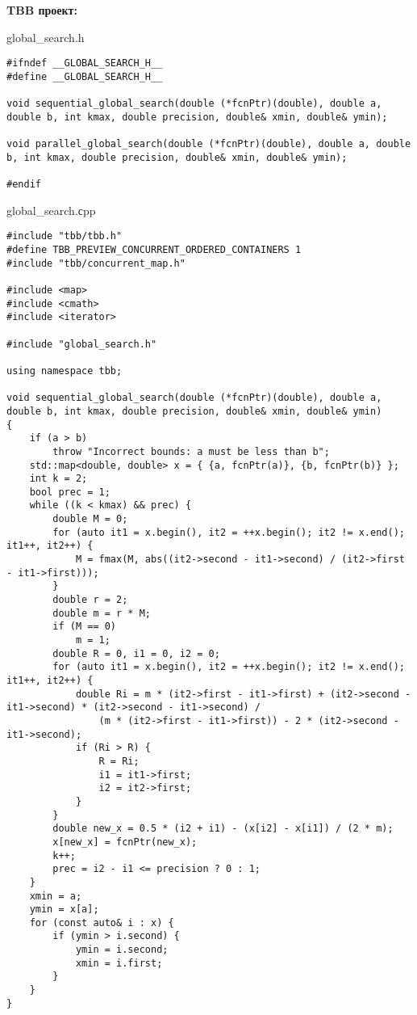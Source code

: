 \documentclass{report}
\begin{document}
\textbf{TBB проект:}

global\_search.h
\begin{lstlisting}
#ifndef __GLOBAL_SEARCH_H__
#define __GLOBAL_SEARCH_H__

void sequential_global_search(double (*fcnPtr)(double), double a, double b, int kmax, double precision, double& xmin, double& ymin);

void parallel_global_search(double (*fcnPtr)(double), double a, double b, int kmax, double precision, double& xmin, double& ymin);

#endif
\end{lstlisting}

global\_search.сpp
\begin{lstlisting}
#include "tbb/tbb.h"
#define TBB_PREVIEW_CONCURRENT_ORDERED_CONTAINERS 1
#include "tbb/concurrent_map.h"

#include <map>
#include <cmath>
#include <iterator>

#include "global_search.h"

using namespace tbb;

void sequential_global_search(double (*fcnPtr)(double), double a, double b, int kmax, double precision, double& xmin, double& ymin)
{
    if (a > b)
        throw "Incorrect bounds: a must be less than b";
    std::map<double, double> x = { {a, fcnPtr(a)}, {b, fcnPtr(b)} };
    int k = 2;
    bool prec = 1;
    while ((k < kmax) && prec) {
        double M = 0;
        for (auto it1 = x.begin(), it2 = ++x.begin(); it2 != x.end(); it1++, it2++) {
            M = fmax(M, abs((it2->second - it1->second) / (it2->first - it1->first)));
        }
        double r = 2;
        double m = r * M;   
        if (M == 0)
            m = 1;
        double R = 0, i1 = 0, i2 = 0;
        for (auto it1 = x.begin(), it2 = ++x.begin(); it2 != x.end(); it1++, it2++) {
            double Ri = m * (it2->first - it1->first) + (it2->second - it1->second) * (it2->second - it1->second) /
                (m * (it2->first - it1->first)) - 2 * (it2->second - it1->second);
            if (Ri > R) {
                R = Ri;
                i1 = it1->first;
                i2 = it2->first;
            }
        }
        double new_x = 0.5 * (i2 + i1) - (x[i2] - x[i1]) / (2 * m);
        x[new_x] = fcnPtr(new_x);
        k++;
        prec = i2 - i1 <= precision ? 0 : 1;
    }
    xmin = a;
    ymin = x[a];
    for (const auto& i : x) {
        if (ymin > i.second) {
            ymin = i.second;
            xmin = i.first;
        }
    }
}


\end{lstlisting}
\end{document}
